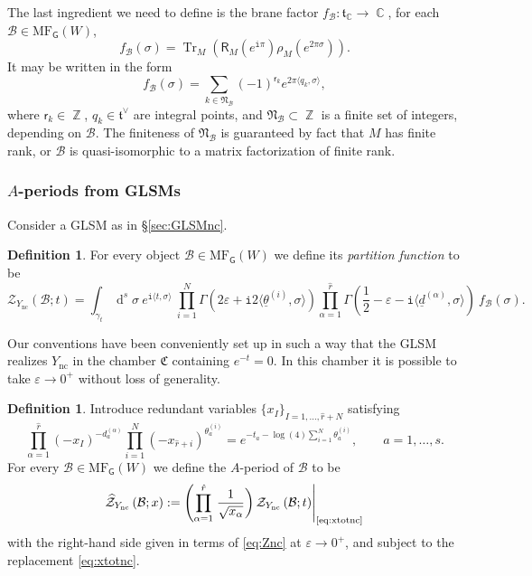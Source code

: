\documentclass[12pt,a4paper,oneside]{amsart}
\numberwithin{equation}{section}
\theoremstyle{definition}
\newtheorem{defin}[thm]{Definition}
\theoremstyle{remark}
\DeclareMathOperator{\C}{\mathbb{C}}
\DeclareMathOperator{\Z}{\mathbb{Z}}
\DeclareMathOperator{\dd}{d}
\DeclareMathOperator{\tr}{Tr}
\newcommand{\mz}{\mathcal{Z}}
\newcommand{\sR}{\mathsf{R}}
\newcommand{\sG}{\mathsf{G}}
\newcommand{\Br}{\mathcal{B}}
\newcommand{\Ync}{Y_{\mathrm{nc}}}
\newcommand{\pz}{\widehat{\mathcal{Z}}}
\newcommand{\MF}{\mathrm{MF}}
\newcommand{\ii}{\mathtt{i}}
\begin{document}
The last ingredient we need to define is the brane factor $f_{\Br} : \mathfrak{t}_{\C} \to \C$, for each $\Br \in \MF_{\sG} (W)$, 
\begin{equation*}
	f_{\Br} (\sigma) = \tr_M \left( \sR_M \left( e^{\ii \pi} \right) \rho_M \left( e^{2 \pi \sigma} \right)\right) .
\end{equation*}
It may be written in the form
\begin{equation}
\label{eq:fBsum}
	f_{\Br} (\sigma) = \sum_{k \in \mathfrak{N}_{\Br}} (-1)^{\mathsf{r}_{k}}e^{2 \pi \langle q_k, \sigma \rangle} ,
\end{equation}
where $\mathsf{r}_{k} \in \Z$, $q_k \in \mathfrak{t}^{\vee}$ are integral points, and $\mathfrak{N}_{\Br} \subset \Z$ is a finite set of integers, depending on $\Br$. The finiteness of $\mathfrak{N}_{\Br}$ is guaranteed by fact that $M$ has finite rank, or $\Br$ is quasi-isomorphic to a matrix factorization of finite rank. 


\subsubsection{\texorpdfstring{$A$}{A}-periods from GLSMs}
Consider a GLSM as in \S\ref{sec:GLSMnc}. 
\begin{defin}
    For every object $\Br \in \MF_{\sG} (W)$ we define its \emph{partition function} to be
\begin{equation}
\label{eq:Znc}
	\mz_{\Ync} \left( \Br; t \right) = \int_{\gamma_t} \dd^s \sigma~e^{\ii \langle t, \sigma\rangle} ~\prod_{i=1}^{N} \Gamma \left( 2\varepsilon + \ii 2 \langle \underline{\theta}^{(i)}, \sigma \rangle \right) \prod_{\alpha=1}^{\hat{r}} \Gamma \left( \frac{1}{2} - \varepsilon - \ii \langle\underline{d}^{(\alpha)}, \sigma \rangle \right) ~f_{\Br} (\sigma) .
\end{equation}
\end{defin}
Our conventions have been conveniently set up in such a way that the GLSM realizes $\Ync$ in the chamber $\mathfrak{C}$ containing $e^{-t}=0$. In this chamber it is possible to take $\varepsilon \to 0^{+}$ without loss of generality.\par
\begin{defin}
    Introduce redundant variables $\{ x_I\}_{I=1,\dots , \hat{r}+N}$ satisfying 
    \begin{equation}
    \label{eq:xtotnc}
        \prod_{\alpha=1}^{\hat{r}} (-x_I )^{-d^{(\alpha)}_a}\prod_{i=1}^{N} (-x_{\hat{r}+i} )^{\theta^{(i)}_a} = e^{-t_a - \log (4) \sum_{i=1}^{N}\theta^{(i)}_a } , \qquad a=1, \dots, s .
    \end{equation}
    For every $\Br \in \MF_{\sG} (W)$ we define the $A$-period of $\Br$ to be 
    \begin{equation}\label{eq:Anc}
        \pz_{\Ync} \left( \Br ; x \right) := \left(\prod_{\alpha=1}^{\hat{r}} \left. \frac{1}{\sqrt{x_{\alpha}}} \right)\mz_{\Ync} \left( \Br; t \right) \right\rvert_{\text{\eqref{eq:xtotnc}}}
    \end{equation}
    with the right-hand side given in terms of \eqref{eq:Znc} at $\varepsilon \to 0^{+}$, and subject to the replacement \eqref{eq:xtotnc}.
\end{defin}
\end{document}
